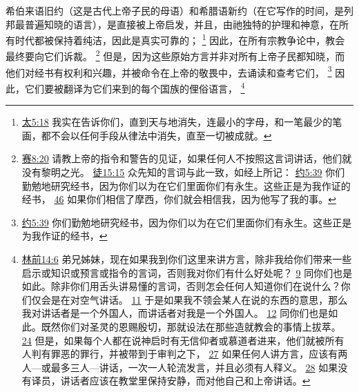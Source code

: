 \documentclass[12pt, a4paper, oneside]{ctexart}
\newcounter{parnum}[section]
\newcommand{\N}{%
   \noindent\refstepcounter{parnum}%
    \makebox[\parindent][l]{\textbf{\arabic{parnum}.}}}
\begin{document}
\N 希伯来语旧约（这是古代上帝子民的母语）和希腊语新约（在它写作的时间，是列邦最普遍知晓的语言），是直接被上帝启发，并且，由祂独特的护理和神意，在所有时代都被保持着纯洁，因此是真实可靠的；
	\footnote {
		\href{https://biblehub.com/matthew/5-18.htm}{太5:18} 我实在告诉你们，直到天与地消失，连最小的字母，和一笔最少的笔画，都不会以任何手段从律法中消失，直至一切被成就。
	}
	因此，在所有宗教争论中，教会最终要向它们诉裁。
	\footnote {
		\href{https://biblehub.com/isaiah/8-20.htm}{赛8:20} 请教上帝的指令和警告的见证，如果任何人不按照这言词讲话，他们就没有黎明之光。
		\href{https://biblehub.com/acts/15-15.htm}{徒15:15} 众先知的言词与此一致，如经上所记：
		\href{https://biblehub.com/john/5-39.htm}{约5:39} 你们勤勉地研究经书，因为你们以为在它们里面你们有永生。这些正是为我作证的经书，
		\href{https://biblehub.com/john/5-46.htm}{46} 如果你们相信了摩西，你们就会相信我，因为他写了我的事。
	}
	但是，因为这些原始方言并非对所有上帝子民都知晓，而他们对经书有权利和兴趣，并被命令在上帝的敬畏中，去诵读和查考它们，
	\footnote {
		\href{https://biblehub.com/john/5-39.htm}{约5:39} 你们勤勉地研究经书，因为你们以为在它们里面你们有永生。这些正是为我作证的经书，
	}
	因此，它们要被翻译为它们来到的每个国族的俚俗语言，
	\footnote {
		\href{https://biblehub.com/1_corinthians/14-6.htm}{林前14:6} 弟兄姊妹，现在如果我到你们这里来讲方言，除非我给你们带来一些启示或知识或预言或指令的言词，否则我对你们有什么好处呢？
		\href{https://biblehub.com/1_corinthians/14-9.htm}{9} 同你们也是如此。除非你们用舌头讲易懂的言词，否则怎会任何人知道你们在说什么？你们仅会是在对空气讲话。
		\href{https://biblehub.com/1_corinthians/14-11.htm}{11} 于是如果我不领会某人在说的东西的意思，那么我对讲话者是一个外国人，而讲话者对我是一个外国人。
		\href{https://biblehub.com/1_corinthians/14-12.htm}{12} 同你们也是如此。既然你们对圣灵的恩赐殷切，那就设法在那些造就教会的事情上拔萃。
		\href{https://biblehub.com/1_corinthians/14-24.htm}{24} 但是，如果每个人都在说神启时有无信仰者或慕道者进来，他们就被所有人判有罪恶的罪行，并被带到于审判之下，
		\href{https://biblehub.com/1_corinthians/14-27.htm}{27} 如果任何人讲方言，应该有两人---或最多三人---讲话，一次一人轮流发言，并且必须有人释义。
		\href{https://biblehub.com/1_corinthians/14-28.htm}{28} 如果没有译员，讲话者应该在教堂里保持安静，而对他自己和上帝讲话。
	}
\end{document}
